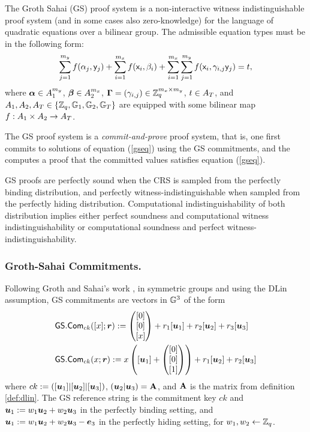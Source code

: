 The Groth Sahai (GS) proof system is a non-interactive witness indistinguishable proof system (and in some cases also zero-knowledge) for the language of quadratic equations over a bilinear group. The admissible equation types must be in the following form:
\begin{equation}\label{gseq}
\sum_{j=1}^{m_y} f(\alpha_j, \mathsf{y}_j)+\sum_{i=1}^{m_x} f(\mathsf{x}_i, \beta_i)+\sum_{i=1}^{m_x} \sum_{j=1}^{m_y}  f(\mathsf{x}_i,\gamma_{i,j} \mathsf{y}_j)=t,
\end{equation}
 where $\boldsymbol \alpha  \in A_1^{m_y}$, $\boldsymbol \beta  \in A_2^{m_x}$, $\mathbf{{\Gamma}}=(\gamma_{i,j}) \in \mathbb{Z}_q^{m_x\times m_y}$, $t \in A_T$, and $A_1,A_2,A_T\in\{\mathbb{Z}_q,\mathbb{G}_1,\mathbb{G}_2,\mathbb{G}_T\}$ 
are equipped with some bilinear map $f:A_1\times A_2 \rightarrow A_T$.

The GS proof system is a \emph{commit-and-prove} proof system, that is, one first commits to solutions
of equation (\ref{gseq}) using the GS commitments, and the computes a proof that the committed values satisfies equation (\ref{gseq}).

GS proofs are perfectly sound when the CRS is sampled from the perfectly binding distribution, and perfectly witness-indistinguishable when sampled from the perfectly hiding distribution. Computational indistinguishability of  both distribution implies either perfect soundness and computational witness indistinguishability or computational soundness and perfect witness-indistinguishability.

\subsubsection{Groth-Sahai Commitments.}
Following Groth and Sahai's work \cite{EC:GroSah08}, in symmetric groups and using the  DLin assumption, GS commitments are vectors in $\mathbb{G}^3$ of the form
\begin{align*}
&{\mathsf{GS}}.\mathsf{Com}_{ck}([x];{\boldsymbol{r}}):=\left(\begin{matrix}{[0]}\\{[0]}\\{[x]}\end{matrix}\right)+r_1[{\boldsymbol{u}}_1]+{r}_2[{\boldsymbol{u}}_2]+r_3[{\boldsymbol{u}}_3]\\
&{\mathsf{GS}}.\mathsf{Com}_{ck}(x;{\boldsymbol{r}}):=x\left([{\boldsymbol{u}}_1]+\left(\begin{matrix}{[0]}\\{[0]}\\{[1]}\end{matrix}\right)\right)+{r}_1[{\boldsymbol{u}}_2]+r_2[{\boldsymbol{u}}_3]
\end{align*}
where $ck:=([{\boldsymbol{u}}_1]|[{\boldsymbol{u}}_2]|[{\boldsymbol{u}}_3])$, $({\boldsymbol{u}}_2|{\boldsymbol{u}}_3)=\mathbf{{A}}$, and $\mathbf{{A}}$ is the matrix from definition \ref{def:dlin}. The GS reference string is the commitment key $ck$  and ${\boldsymbol{u}}_1:=w_1{\boldsymbol{u}}_2+w_2{\boldsymbol{u}}_3$ in the perfectly binding setting, and ${\boldsymbol{u}}_1:=w_1{\boldsymbol{u}}_2+w_2{\boldsymbol{u}}_3-{\boldsymbol{e}}_3$ in the perfectly hiding setting, for $w_1,w_2\gets\mathbb{Z}_q$.

